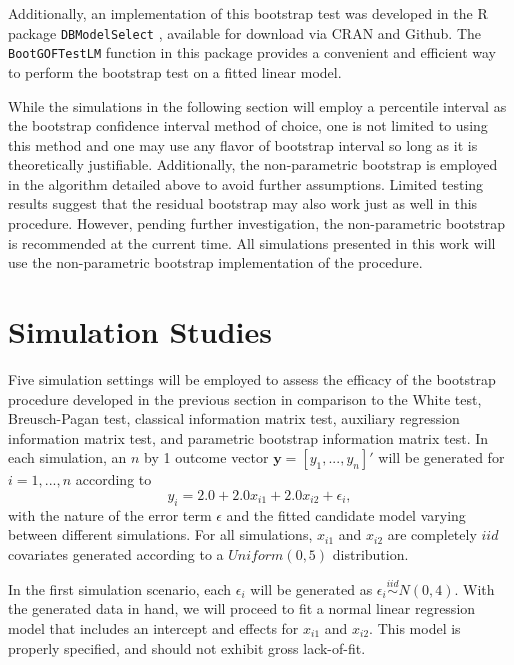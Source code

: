 \documentclass[sn-mathphys-ay]{sn-jnl}
\begin{document}
		Additionally, an implementation of this bootstrap test was developed in the R package \texttt{DBModelSelect} \citep{Koeneman}, available for download via CRAN and Github.
		The \texttt{BootGOFTestLM} function in this package provides a convenient and efficient way to perform the bootstrap test on a fitted linear model.
		
		While the simulations in the following section will employ a percentile interval as the bootstrap confidence interval method of choice, one is not limited to using this method
		and one may use any flavor of bootstrap interval so long as it is theoretically justifiable. Additionally, the non-parametric bootstrap is employed in the algorithm detailed above to avoid further
		assumptions. Limited testing results suggest that the residual bootstrap may also work just as well in this procedure. However, pending further investigation, the non-parametric
		bootstrap is recommended at the current time. All simulations presented in this work will use the non-parametric bootstrap implementation of the procedure.

\section{Simulation Studies}

Five simulation settings will be employed to assess the efficacy of the bootstrap procedure developed in the previous section in comparison to the White test, Breusch-Pagan test, classical information matrix test, auxiliary regression information matrix test, and parametric bootstrap information matrix test. In each simulation, an $n$ by 1 outcome vector $\bm{y} = [y_1,...,y_n]'$ will
be generated for $i = 1,...,n$ according to
\begin{equation*}
	y_i = 2.0 + 2.0 x_{i1} + 2.0 x_{i2} + \epsilon_i , 
\end{equation*}
with the nature of the error term $\epsilon$ and the fitted candidate model varying between different simulations. For all simulations, $x_{i1}$ and $x_{i2}$ are completely $iid$ covariates generated according to
a $Uniform(0,5)$ distribution.

In the first simulation scenario, each $\epsilon_i$ will be generated as $\epsilon_i \stackrel{iid}{\sim} N(0,4)$. With the generated data in hand, we will proceed to fit a normal linear regression model that includes an intercept and effects for $x_{i1}$ and $x_{i2}$. This model
is properly specified, and should not exhibit gross lack-of-fit.
\end{document}
